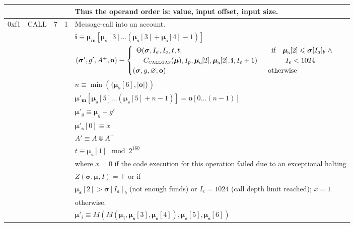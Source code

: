 \documentclass[9pt,oneside]{amsart}
\begin{document}
\begin{tabular*}{\columnwidth}[h]{rlrrl}
&&&& Thus the operand order is: value, input offset, input size. \\
\midrule
0xf1 & {\small CALL} & 7 & 1 & Message-call into an account. \\
&&&& $\mathbf{i} \equiv \boldsymbol{\mu}_\mathbf{m}[ \boldsymbol{\mu}_\mathbf{s}[3] \dots (\boldsymbol{\mu}_\mathbf{s}[3] + \boldsymbol{\mu}_\mathbf{s}[4] - 1) ]$ \\
&&&& $(\boldsymbol{\sigma}', g', A^+, \mathbf{o}) \equiv \begin{cases}\begin{array}{l}\Theta(\boldsymbol{\sigma}, I_a, I_o, t, t,\\ \quad C_{\text{\tiny CALLGAS}}(\boldsymbol{\mu}), I_p, \boldsymbol{\mu}_\mathbf{s}[2], \boldsymbol{\mu}_\mathbf{s}[2], \mathbf{i}, I_e + 1)\end{array} & \begin{array}{l}\text{if} \quad \boldsymbol{\mu}_\mathbf{s}[2] \leqslant \boldsymbol{\sigma}[I_a]_b \;\wedge \\ \quad\quad I_e < 1024\end{array}\\ (\boldsymbol{\sigma}, g, \varnothing, \mathbf{o}) & \text{otherwise} \end{cases}$ \\
&&&& $n \equiv \min(\{ \boldsymbol{\mu}_\mathbf{s}[6], |\mathbf{o}|\})$ \\
&&&& $\boldsymbol{\mu}'_\mathbf{m}[ \boldsymbol{\mu}_\mathbf{s}[5] \dots (\boldsymbol{\mu}_\mathbf{s}[5] + n - 1) ] = \mathbf{o}[0 \dots (n - 1)]$ \\
&&&& $\boldsymbol{\mu}'_g \equiv \boldsymbol{\mu}_g + g'$ \\
&&&& $\boldsymbol{\mu}'_\mathbf{s}[0] \equiv x$ \\
&&&& $A' \equiv A \Cup A^+$ \\
&&&& $t \equiv \boldsymbol{\mu}_\mathbf{s}[1] \mod 2^{160}$ \\
&&&& where $x=0$ if the code execution for this operation failed due to an exceptional halting \\
&&&& $Z(\boldsymbol{\sigma}, \boldsymbol{\mu}, I) = \top$ or if  \\
&&&& $\boldsymbol{\mu}_\mathbf{s}[2] > \boldsymbol{\sigma}[I_a]_b$ (not enough funds) or $I_e = 1024$ (call depth limit reached); $x=1$ \\
&&&& otherwise. \\
&&&& $\boldsymbol{\mu}'_i \equiv M(M(\boldsymbol{\mu}_i, \boldsymbol{\mu}_\mathbf{s}[3], \boldsymbol{\mu}_\mathbf{s}[4]), \boldsymbol{\mu}_\mathbf{s}[5], \boldsymbol{\mu}_\mathbf{s}[6])$ \\

\end{tabular*}
\end{document}
